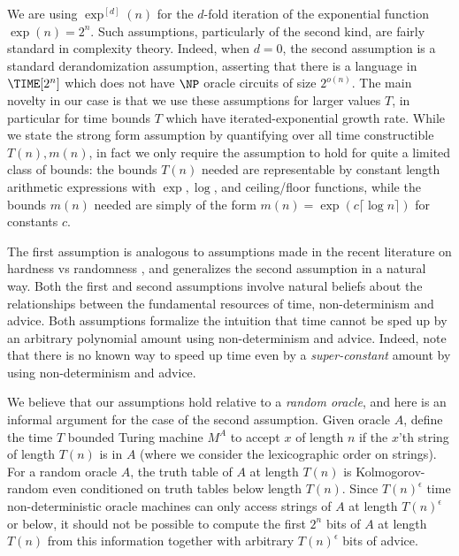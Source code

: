 We are using $\exp^{[d]}(n)$ for the $d$-fold iteration of the exponential function $\exp(n) = 2^n$. Such assumptions, particularly of the second kind, are fairly standard in complexity theory. Indeed, when $d = 0$, the second assumption is a standard derandomization assumption, asserting that there is a language in $\TIME[2^{n}]$ which does not have $\NP$ oracle circuits of size $2^{o(n)}$. The main novelty in our case is that we use these assumptions for larger values $T$, in particular for time bounds $T$ which have iterated-exponential growth rate. While we state the strong form assumption by quantifying over all time constructible $T(n),m(n)$, in fact we only require the assumption to hold for quite a limited class of bounds: the bounds $T(n)$ needed are representable by constant length arithmetic expressions with $\exp,\log$, and ceiling/floor functions, while the bounds $m(n)$ needed are simply of the form $m(n) = \exp(c\lceil \log n \rceil )$ for constants $c$.


The first assumption is analogous to assumptions made in the recent literature on hardness vs randomness \cite{CT21a}, and generalizes the second assumption in a natural way. Both the first and second assumptions involve natural beliefs about the relationships between the fundamental resources of time, non-determinism and advice. Both assumptions formalize the intuition that time cannot be sped up by an arbitrary polynomial amount using non-determinism and advice. Indeed, note that there is no known way to speed up time even by a {\it super-constant} amount by using non-determinism and advice. 

We believe that our assumptions hold relative to a {\it random oracle}, and here is an informal argument for the case of the second assumption. Given oracle $A$, define the time $T$ bounded Turing machine $M^A$ to accept $x$ of length $n$ if the $x$'th string of length $T(n)$ is in $A$ (where we consider the lexicographic order on strings). For a random oracle $A$, the truth table of $A$ at length $T(n)$ is Kolmogorov-random even conditioned on truth tables below length $T(n)$. Since $T(n)^{\epsilon}$ time non-deterministic oracle machines can only access strings of $A$ at length $T(n)^{\epsilon}$ or below, it should not be possible to compute the first $2^n$ bits of $A$ at length $T(n)$ from this information together with arbitrary $T(n)^{\epsilon}$ bits of advice.

